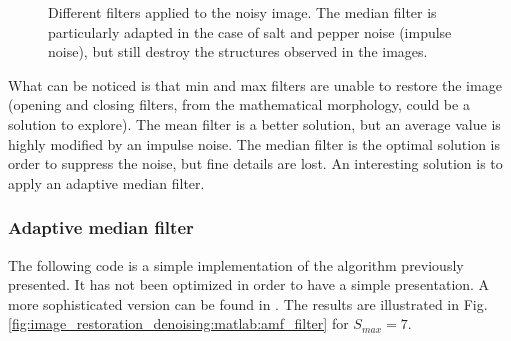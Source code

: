 \begin{figure}[htbp]
 \hspace{1cm}
 
 \caption{Different filters applied to the noisy image. The median filter is particularly adapted in the case of salt and pepper noise (impulse noise), but still destroy the structures observed in the images.}
 \label{fig:image_restoration_denoising:matlab:filters}

\end{figure}

What can be noticed is that min and max filters are unable to restore the image (opening and closing filters, from the mathematical morphology, could be a solution to explore). The mean filter is a better solution, but an average value is highly modified by an impulse noise. The median filter is the optimal solution is order to suppress the noise, but fine details are lost. An interesting solution is to apply an adaptive median filter. 

\newpage
\subsubsection{Adaptive median filter}
The following code is a simple implementation of the algorithm previously presented. It has not been optimized in order to have a simple presentation. A more sophisticated version can be found in \cite{Gonzalez2002}. The results are illustrated in Fig.\ref{fig:image_restoration_denoising:matlab:amf_filter} for $S_{max}=7$.

